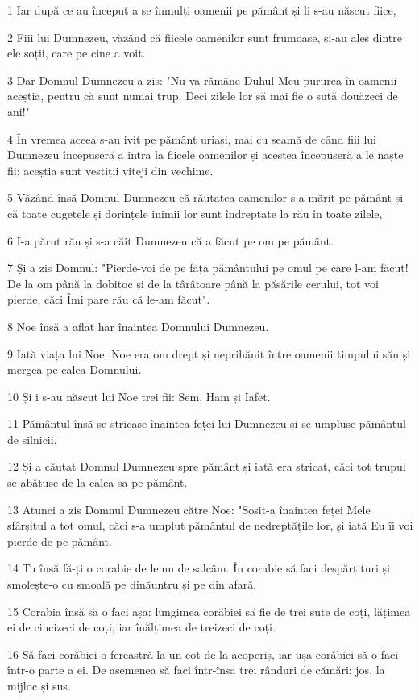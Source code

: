 \par 1 Iar după ce au început a se înmulți oamenii pe pământ și li s-au născut fiice,
\par 2 Fiii lui Dumnezeu, văzând că fiicele oamenilor sunt frumoase, și-au ales dintre ele soții, care pe cine a voit.
\par 3 Dar Domnul Dumnezeu a zis: "Nu va rămâne Duhul Meu pururea în oamenii aceștia, pentru că sunt numai trup. Deci zilele lor să mai fie o sută douăzeci de ani!"
\par 4 În vremea aceea s-au ivit pe pământ uriași, mai cu seamă de când fiii lui Dumnezeu începuseră a intra la fiicele oamenilor și acestea începuseră a le naște fii: aceștia sunt vestiții viteji din vechime.
\par 5 Văzând însă Domnul Dumnezeu că răutatea oamenilor s-a mărit pe pământ și că toate cugetele și dorințele inimii lor sunt îndreptate la rău în toate zilele,
\par 6 I-a părut rău și s-a căit Dumnezeu că a făcut pe om pe pământ.
\par 7 Și a zis Domnul: "Pierde-voi de pe fața pământului pe omul pe care l-am făcut! De la om până la dobitoc și de la târâtoare până la păsările cerului, tot voi pierde, căci Îmi pare rău că le-am făcut".
\par 8 Noe însă a aflat har înaintea Domnului Dumnezeu.
\par 9 Iată viața lui Noe: Noe era om drept și neprihănit între oamenii timpului său și mergea pe calea Domnului.
\par 10 Și i s-au născut lui Noe trei fii: Sem, Ham și Iafet.
\par 11 Pământul însă se stricase înaintea feței lui Dumnezeu și se umpluse pământul de silnicii.
\par 12 Și a căutat Domnul Dumnezeu spre pământ și iată era stricat, căci tot trupul se abătuse de la calea sa pe pământ.
\par 13 Atunci a zis Domnul Dumnezeu către Noe: "Sosit-a înaintea feței Mele sfârșitul a tot omul, căci s-a umplut pământul de nedreptățile lor, și iată Eu îi voi pierde de pe pământ.
\par 14 Tu însă fă-ți o corabie de lemn de salcâm. În corabie să faci despărțituri și smolește-o cu smoală pe dinăuntru și pe din afară.
\par 15 Corabia însă să o faci așa: lungimea corăbiei să fie de trei sute de coți, lățimea ei de cincizeci de coți, iar înălțimea de treizeci de coți.
\par 16 Să faci corăbiei o fereastră la un cot de la acoperiș, iar ușa corăbiei să o faci într-o parte a ei. De asemenea să faci într-însa trei rânduri de cămări: jos, la mijloc și sus.
